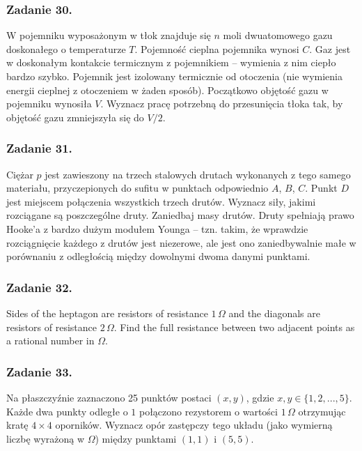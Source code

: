 \documentclass[a4paper, twocolumn]{article}
\begin{document}
\subsubsection*{Zadanie 30.}
W pojemniku wyposażonym w tłok znajduje się \(n\) moli dwuatomowego gazu doskonałego o temperaturze \(T\). Pojemność cieplna pojemnika wynosi \(C\). Gaz jest w doskonałym kontakcie termicznym z pojemnikiem -- wymienia z nim ciepło bardzo szybko. Pojemnik jest izolowany termicznie od otoczenia (nie wymienia energii cieplnej z otoczeniem w żaden sposób). Początkowo objętość gazu w pojemniku wynosiła \(V\). Wyznacz pracę potrzebną do przesunięcia tłoka tak, by objętość gazu zmniejszyła się do \(V/2\).

\subsubsection*{Zadanie 31.}
Ciężar \(p\) jest zawieszony na trzech stalowych drutach wykonanych z tego samego materiału, przyczepionych do sufitu w punktach odpowiednio \(A\), \(B\), \(C\). Punkt \(D\) jest miejscem połączenia wszystkich trzech drutów. Wyznacz siły, jakimi rozciągane są poszczególne druty. Zaniedbaj masy drutów. Druty spełniają prawo Hooke'a z bardzo dużym modułem Younga -- tzn. takim, że wprawdzie rozciągnięcie każdego z drutów jest niezerowe, ale jest ono zaniedbywalnie małe w porównaniu z odległością między dowolnymi dwoma danymi punktami.

\subsubsection*{Zadanie 32.}
Sides of the heptagon are resistors of resistance \(1\,\Omega\) and the diagonals are resistors of resistance \(2\,\Omega\). Find the full resistance between two adjacent points as a rational number in \(\Omega\).

\subsubsection*{Zadanie 33.}
Na płaszczyźnie zaznaczono 25 punktów postaci \((x,y)\), gdzie \(x,y\in\{1,2,...,5\}\). Każde dwa punkty odległe o \(1\) połączono rezystorem o wartości \(1\,\Omega\) otrzymując kratę \(4\times4\) oporników. Wyznacz opór zastępczy tego układu (jako wymierną liczbę wyrażoną w \(\Omega\)) między punktami \((1,1)\) i \((5,5)\).
\end{document}
